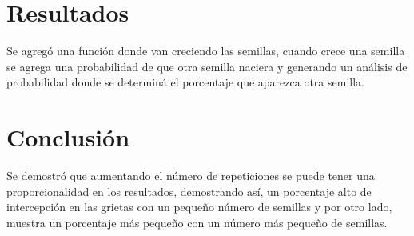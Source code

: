 \documentclass{article}
\begin{document}
\section{Resultados}
Se agregó una función donde van creciendo las semillas, cuando crece una semilla se agrega una probabilidad de que otra semilla naciera y generando un análisis de probabilidad donde se  determiná el porcentaje que aparezca otra semilla.

 \section{Conclusión}

 Se demostró que aumentando el número de repeticiones se puede tener una proporcionalidad en los resultados, demostrando así, un porcentaje alto de intercepción en las grietas con un pequeño número de semillas y por otro lado, muestra un porcentaje más pequeño con un número más pequeño de semillas.

 
 

 
\end{document}
